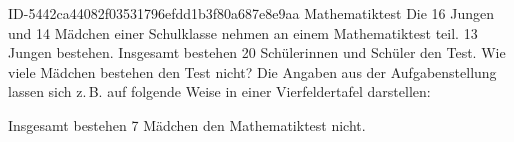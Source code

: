 \begin{exercise}
      {ID-5442ca44082f03531796efdd1b3f80a687e8e9aa}
      {Mathematiktest}
  \ifproblem\problem
    Die \num{16} Jungen und \num{14} Mädchen einer Schulklasse nehmen an einem
    Mathematiktest teil. \num{13} Jungen bestehen. Insgesamt bestehen \num{20}
    Schülerinnen und Schüler den Test. Wie viele Mädchen bestehen den
    Test nicht?
  \fi
  \ifoutline\outline
    Die Angaben aus der Aufgabenstellung lassen sich z.\,B. auf folgende
    Weise in einer Vierfeldertafel darstellen:
    \begin{center}
      \begin{fourfoldtable}
      \end{fourfoldtable}%
    \end{center}
  \fi
  \ifoutcome\outcome
    Insgesamt bestehen \num{7} Mädchen den Mathematiktest nicht.
    \begin{center}
      \begin{fourfoldtable}
      \end{fourfoldtable}%
    \end{center}
  \fi
\end{exercise}

